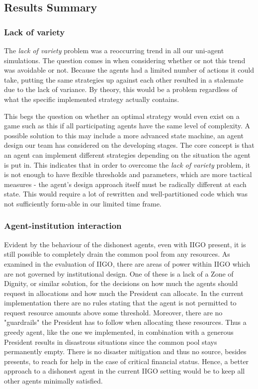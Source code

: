 \subsection{Results Summary} \label{ResultSummary}
\subsubsection{Lack of variety}
The \emph{lack of variety} problem was a reoccurring trend in all our uni-agent simulations. The question comes in when considering whether or not this trend was avoidable or not. Because the agents had a limited number of actions it could take, putting the same strategies up against each other resulted in a stalemate due to the lack of variance. By theory, this would be a problem regardless of what the specific implemented strategy actually contains.

This begs the question on whether an optimal strategy would even exist on a game such as this if all participating agents have the same level of complexity. A possible solution to this may include a more advanced state machine, an agent design our team has considered on the developing stages. The core concept is that an agent can implement different strategies depending on the situation the agent is put in. This indicates that in order to overcome the \emph{lack of variety} problem, it is not enough to have flexible thresholds and parameters, which are more tactical measures - the agent's design approach itself must be radically different at each state. This would require a lot of rewritten and well-partitioned code which was not sufficiently form-able in our limited time frame.

\subsubsection{Agent-institution interaction}

Evident by the behaviour of the dishonest agents, even with IIGO present, it is still possible to completely drain the common pool from any resources. As examined in the evaluation of IIGO, there are areas of power within IIGO which are not governed by institutional design. One of these is a lack of a Zone of Dignity, or similar solution, for the decisions on how much the agents should request in allocations and how much the President can allocate. In the current implementation there are no rules stating that the agent is not permitted to request resource amounts above some threshold. Moreover, there are no "guardrails" the President has to follow when allocating these resources. Thus a greedy agent, like the one we implemented, in combination with a generous President results in disastrous situations since the common pool stays permanently empty. There is no disaster mitigation and thus no source, besides presents, to reach for help in the case of critical financial status. Hence, a better approach to a dishonest agent in the current IIGO setting would be to keep all other agents minimally satisfied.

